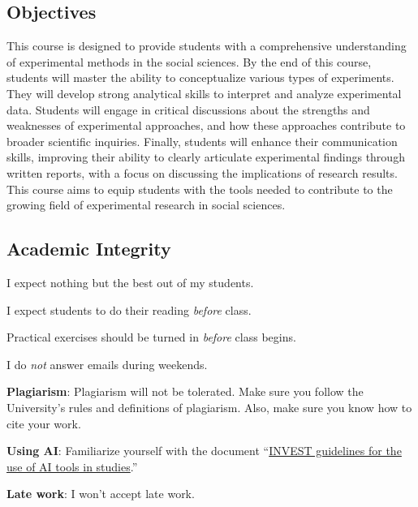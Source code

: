 \documentclass[letterpaper]{article}
\renewenvironment{itemize}{
  \begin{list}{}{
    \setlength{\leftmargin}{1.5em}
  }
}{
  \end{list}
}
\begin{document}
\subsection*{Objectives}

This course is designed to provide students with a comprehensive understanding of experimental methods in the social sciences. By the end of this course, students will master the ability to conceptualize various types of experiments. They will develop strong analytical skills to interpret and analyze experimental data. Students will engage in critical discussions about the strengths and weaknesses of experimental approaches, and how these approaches contribute to broader scientific inquiries. Finally, students will enhance their communication skills, improving their ability to clearly articulate experimental findings through written reports, with a focus on discussing the implications of research results. This course aims to equip students with the tools needed to contribute to the growing field of experimental research in social sciences.



\subsection*{Academic Integrity}

I expect nothing but the best out of my students. 

\begin{itemize}
     \item[$\circ$] I expect students to do their reading \emph{before} class.
     \item[$\circ$] Practical exercises should be turned in \emph{before} class begins. 

  \item[$\circ$] I do \emph{not} answer emails during weekends. 
\end{itemize}


\begin{itemize}
  \item[{\color{red}\Pointinghand}] {\bf Plagiarism}: Plagiarism will not be tolerated. Make sure you follow the University's rules and definitions of plagiarism. Also, make sure you know how to cite your work. 

  \item[{\color{red}\Pointinghand}] {\bf Using AI}: Familiarize yourself with the document ``\href{https://github.com/hbahamonde/Exp_Soc_Science/raw/main/AI_Guidelines.pdf}{INVEST guidelines for the use of AI tools in studies}.'' 

  \item[{\color{red}\Pointinghand}] {\bf Late work}: I won't accept late work.

\end{itemize}
\end{document}
